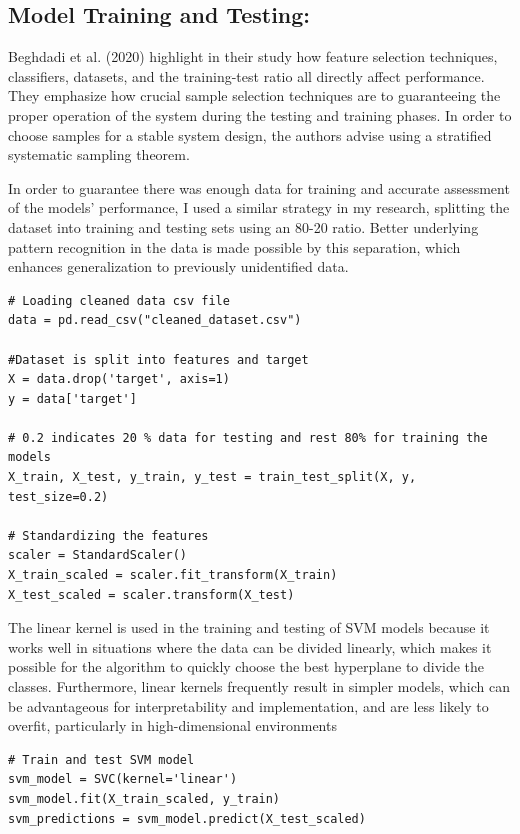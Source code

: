 \begin{itemize}
\section{Model Training and Testing:}

Beghdadi et al. (2020) highlight in their study how feature selection techniques, classifiers, datasets, and the training-test ratio all directly affect performance. They emphasize how crucial sample selection techniques are to guaranteeing the proper operation of the system during the testing and training phases. In order to choose samples for a stable system design, the authors advise using a stratified systematic sampling theorem.

In order to guarantee there was enough data for training and accurate assessment of the models' performance, I used a similar strategy in my research, splitting the dataset into training and testing sets using an 80-20 ratio. Better underlying pattern recognition in the data is made possible by this separation, which enhances generalization to previously unidentified data.
\begin{lstlisting}[style=mystyle, caption={Loading data, splitting dataset, and standardizing features in Python.}, label=pythoncode]
# Loading cleaned data csv file
data = pd.read_csv("cleaned_dataset.csv")

#Dataset is split into features and target
X = data.drop('target', axis=1)
y = data['target']

# 0.2 indicates 20 % data for testing and rest 80% for training the models
X_train, X_test, y_train, y_test = train_test_split(X, y, test_size=0.2)

# Standardizing the features
scaler = StandardScaler()
X_train_scaled = scaler.fit_transform(X_train)
X_test_scaled = scaler.transform(X_test)
\end{lstlisting}

The linear kernel is used in the training and testing of SVM models because it works well in situations where the data can be divided linearly, which makes it possible for the algorithm to quickly choose the best hyperplane to divide the classes. Furthermore, linear kernels frequently result in simpler models, which can be advantageous for interpretability and implementation, and are less likely to overfit, particularly in high-dimensional environments

\begin{lstlisting}[style=mystyle, caption={SVM training and testing}, label=pythoncode2]
# Train and test SVM model
svm_model = SVC(kernel='linear')
svm_model.fit(X_train_scaled, y_train)
svm_predictions = svm_model.predict(X_test_scaled)


\end{lstlisting}
\end{itemize}
